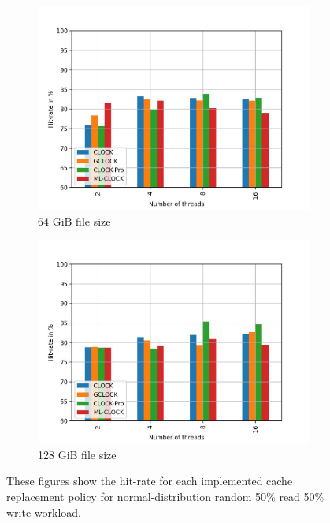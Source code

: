 \documentclass[
	12pt,
	a4paper,
	abstract,
	bibliography=totoc,
	chapterprefix,
	headings=openright,
	numbers=endperiod,
	parskip=half,
	twoside,
]{scrreprt}
\begin{document}
\begin{figure}[H]
\begin{subfigure}{0.4\textwidth}
		\includegraphics[width=\textwidth]{multi_64_gb_rw_50to50_normal.jpg}		
		\caption{64 GiB file size}
		\label{fig:rw_90to10  zoned}
	\end{subfigure}
	\hfill
	\begin{subfigure}{0.4\textwidth}
		\includegraphics[width=\textwidth]{multi_128_gb_rw_50to50_normal.jpg}		
		\caption{128 GiB file size}
		\label{fig:rw_90to10  uniform}
	\end{subfigure}
	\caption{These figures show the hit-rate for each implemented cache replacement policy for normal-distribution random 50\% read 50\% write workload.}
\end{figure}


\end{document}
